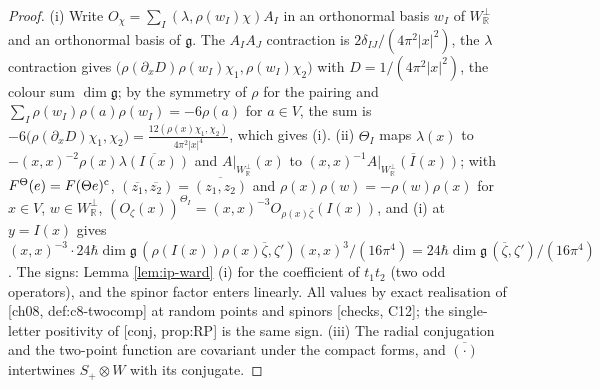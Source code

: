 \documentclass[11pt]{report}
\theoremstyle{plain}
\theoremstyle{definition}
\numberwithin{equation}{chapter}
\newcommand{\Wp}{W_{\mathbb R}^\perp}
\begin{document}
\begin{proof}
(i) Write $O_\chi=\sum_I(\lambda,\rho(w_I)\chi)A_I$ in an orthonormal basis $w_I$ of $\Wp$ and an orthonormal basis of $\mathfrak g$. The $A_IA_J$ contraction is $2\delta_{IJ}/(4\pi^2|x|^2)$, the $\lambda$ contraction gives $\big(\rho(\partial_xD)\rho(w_I)\chi_1,\rho(w_I)\chi_2\big)$ with $D=1/(4\pi^2|x|^2)$, the colour sum $\dim\mathfrak g$; by the symmetry of $\rho$ for the pairing and $\sum_I\rho(w_I)\rho(a)\rho(w_I)=-6\rho(a)$ for $a\in V$, the sum is $-6\big(\rho(\partial_xD)\chi_1,\chi_2\big)=\frac{12(\rho(x)\chi_1,\chi_2)}{4\pi^2|x|^4}$, which gives (i). (ii) $\Theta_I$ maps $\lambda(x)$ to $-(x,x)^{-2}\rho(x)\overline{\lambda(I(x))}$ and $A|_{\Wp}(x)$ to $(x,x)^{-1}\overline{A|_{\Wp}(I(x))}$; with $F^\Theta(e)=F(\Theta e)^{\rm c}$, $(\overline{z_1},\overline{z_2})=\overline{(z_1,z_2)}$ and $\rho(x)\rho(w)=-\rho(w)\rho(x)$ for $x\in V$, $w\in\Wp$, $(O_\zeta(x))^{\Theta_I}=(x,x)^{-3}O_{\rho(x)\overline\zeta}(I(x))$, and (i) at $y=I(x)$ gives $(x,x)^{-3}\cdot24\hbar\dim\mathfrak g\,(\rho(I(x))\rho(x)\overline\zeta,\zeta')(x,x)^{3}/(16\pi^4)=24\hbar\dim\mathfrak g\,(\overline\zeta,\zeta')/(16\pi^4)$. The signs: Lemma \ref{lem:ip-ward} (i) for the coefficient of $t_1t_2$ (two odd operators), and the spinor factor enters linearly. All values by exact realisation of [ch08, def:c8-twocomp] at random points and spinors [checks, C12]; the single-letter positivity of [conj, prop:RP] is the same sign. (iii) The radial conjugation and the two-point function are covariant under the compact forms, and $\overline{(\cdot)}$ intertwines $S_+\otimes W$ with its conjugate.
\end{proof}
\end{document}
